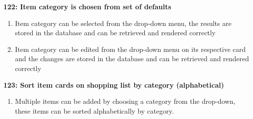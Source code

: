 \documentclass[10pt,onecolumn]{witseiepaper}
\begin{document}
\textbf{122: Item category is chosen from set of defaults}

\begin{enumerate}
	\item Item category can be selected from the drop-down menu, the results are stored in the database and can be retrieved and rendered correctly
	\item Item category can be edited from the drop-down menu on its respective card and the changes are stored in the database and can be retrieved and rendered correctly
\end{enumerate}

\textbf{123: Sort item cards on shopping list by category (alphabetical)}

\begin{enumerate}
	\item Multiple items can be added by choosing a category from the drop-down, these items can be sorted alphabetically by category.
\end{enumerate}
\end{document}
